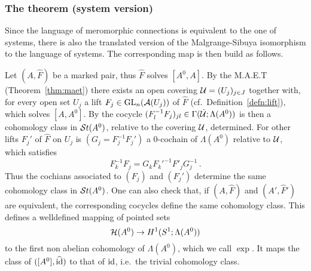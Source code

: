 \subsubsection{The theorem (system version)}
Since the language of meromorphic connections is equivalent to the one of
systems, there is also the translated version of the Malgrange-Sibuya
isomorphism to the language of systems. The corresponding map is then build as
follows.

Let $(A,\hat F)$ be a marked pair, thus $\hat F$ solves $[A^0,A]$.
By the M.A.E.T (Theorem~\ref{thm:maet}) there exists an open covering
$\mathcal{U}=(U_j)_{j\in J}$ together with, for every open set $U_j$ a lift
$F_j\in\operatorname{GL}_n(\mathcal{A}(U_j))$ of $\hat F$ (cf.\ Definition~\ref{defn:lift}), which
solves $[A,A^0]$.
By the cocycle $(F_l^{-1}F_j)_{jl}\in\Gamma(\dot{\mathcal{U}};\Lambda(A^0))$ is then a
cohomology class in $\mathcal{S}{}t(A^0)$, relative to the covering $\mathcal{U}$, determined.
For other lifts $F_j'$ of $\hat F$ on $U_j$ is $(G_j=F_j^{-1}F_j')$ a
$0$-cochain of $\Lambda(A^0)$ relative to $\mathcal{U}$, which satisfies
\[
  F_k^{-1}F_j=G_k F_k'^{-1}F'_j G_j^{-1} \,.
\]
Thus the cochians associated to $(F_j)$ and $(F_j')$ determine the same
cohomology class in $\mathcal{S}{}t(A^0)$.
One can also check that, if $(A,\hat F)$ and $(A',\hat F')$ are equivalent, the
corresponding cocycles define the same cohomology class.
This defines a welldefined mapping of pointed sets
\[
  \mathcal{H}(A^0)\to H^1(S^1;\Lambda(A^0))
\]
to the first non abelian cohomology of $\Lambda(A^0)$, which we call $\exp$.
It maps the class of $([A^0],\widehat{\operatorname{id}})$ to that of $\operatorname{id}$, i.e.\ the trivial
cohomology class.

